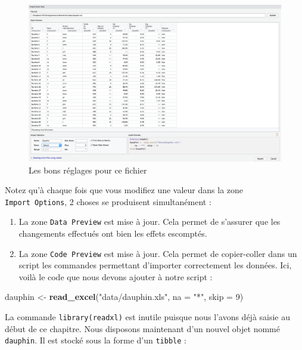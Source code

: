 \documentclass[
  a4paper,
]{article}
\newenvironment{Shaded}{\begin{snugshade}}{\end{snugshade}}
\newcommand{\DataTypeTok}[1]{\textcolor[rgb]{0.00,0.34,0.68}{#1}}
\newcommand{\DecValTok}[1]{\textcolor[rgb]{0.69,0.50,0.00}{#1}}
\newcommand{\KeywordTok}[1]{\textcolor[rgb]{0.12,0.11,0.11}{\textbf{#1}}}
\newcommand{\NormalTok}[1]{\textcolor[rgb]{0.12,0.11,0.11}{#1}}
\newcommand{\StringTok}[1]{\textcolor[rgb]{0.75,0.01,0.01}{#1}}
\providecommand{\tightlist}{%
  \setlength{\itemsep}{0pt}\setlength{\parskip}{0pt}}
\begin{document}
\begin{figure}[htpb]

{\centering \includegraphics[width=1\linewidth]{images/import3} 

}

\caption{Les bons réglages pour ce fichier}\label{fig:import3}
\end{figure}

Notez qu'à chaque fois que vous modifiez une valeur dans la zone \texttt{Import\ Options}, 2 choses se produisent simultanément :

\begin{enumerate}
\def\labelenumi{\arabic{enumi}.}
\tightlist
\item
  La zone \texttt{Data\ Preview} est mise à jour. Cela permet de s'assurer que les changements effectués ont bien les effets escomptés.
\item
  La zone \texttt{Code\ Preview} est mise à jour. Cela permet de copier-coller dans un script les commandes permettant d'importer correctement les données. Ici, voilà le code que nous devons ajouter à notre script :
\end{enumerate}

\begin{Shaded}
\begin{Highlighting}[]
\NormalTok{dauphin <-}\StringTok{ }\KeywordTok{read_excel}\NormalTok{(}\StringTok{"data/dauphin.xls"}\NormalTok{, }\DataTypeTok{na =} \StringTok{"*"}\NormalTok{, }\DataTypeTok{skip =} \DecValTok{9}\NormalTok{)}
\end{Highlighting}
\end{Shaded}

La commande \texttt{library(readxl)} est inutile puisque nous l'avons déjà saisie au début de ce chapitre. Nous disposons maintenant d'un nouvel objet nommé \texttt{dauphin}. Il est stocké sous la forme d'un \texttt{tibble} :
\end{document}
